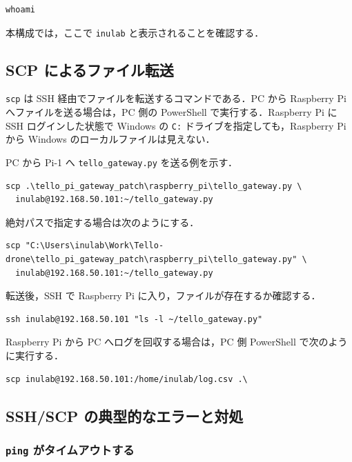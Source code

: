 \begin{lstlisting}
whoami
\end{lstlisting}

本構成では，ここで \texttt{inulab} と表示されることを確認する．

\subsection{SCP によるファイル転送}

\texttt{scp} は SSH 経由でファイルを転送するコマンドである．PC から Raspberry Pi へファイルを送る場合は，PC 側の PowerShell で実行する．Raspberry Pi に SSH ログインした状態で Windows の \texttt{C:} ドライブを指定しても，Raspberry Pi から Windows のローカルファイルは見えない．

PC から Pi-1 へ \texttt{tello\_gateway.py} を送る例を示す．

\begin{lstlisting}
scp .\tello_pi_gateway_patch\raspberry_pi\tello_gateway.py \
  inulab@192.168.50.101:~/tello_gateway.py
\end{lstlisting}

絶対パスで指定する場合は次のようにする．

\begin{lstlisting}
scp "C:\Users\inulab\Work\Tello-drone\tello_pi_gateway_patch\raspberry_pi\tello_gateway.py" \
  inulab@192.168.50.101:~/tello_gateway.py
\end{lstlisting}

転送後，SSH で Raspberry Pi に入り，ファイルが存在するか確認する．

\begin{lstlisting}
ssh inulab@192.168.50.101 "ls -l ~/tello_gateway.py"
\end{lstlisting}

Raspberry Pi から PC へログを回収する場合は，PC 側 PowerShell で次のように実行する．

\begin{lstlisting}
scp inulab@192.168.50.101:/home/inulab/log.csv .\
\end{lstlisting}

\subsection{SSH/SCP の典型的なエラーと対処}

\subsubsection{\texttt{ping} がタイムアウトする}

